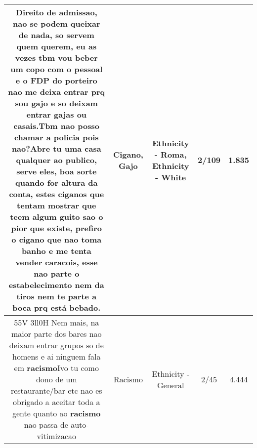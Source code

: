 \documentclass[11pt]{article}
\newlength\mylength
\begin{document}
\begin{center}
\begin{longtable}{|C{.65\mylength}|C{.30\mylength}|C{.12\mylength}|C{.12\mylength}|C{.12\mylength}|}
  \small Direito de admissao, nao se podem queixar de nada, so servem quem querem, eu as vezes tbm vou beber um copo com o pessoal e o FDP do porteiro nao me deixa entrar prq sou \textbf{gajo} e so deixam entrar gajas ou casais.Tbm nao posso chamar a policia pois nao?Abre tu uma casa qualquer ao publico, serve eles, boa sorte quando for altura da conta, estes ciganos que tentam mostrar que teem algum guito sao o pior que existe, prefiro o \textbf{cigano} que nao toma banho e me tenta vender caracois, esse nao parte o estabelecimento nem da tiros nem te parte a boca prq está bebado.\normalsize   & Cigano, Gajo & Ethnicity - Roma, Ethnicity - White & 2/109 & 1.835 \\  \hline
  \small 55V 3ll0H Nem mais, na maior parte dos bares nao deixam entrar grupos so de homens e ai ninguem fala em \textbf{racismo}Ivo tu como dono de um restaurante/bar etc nao es obrigado a aceitar toda a gente quanto ao \textbf{racismo} nao passa de auto-vitimizacao\normalsize   & Racismo & Ethnicity - General & 2/45 & 4.444 \\  \hline
  
\end{longtable}
\end{center}
\end{document}
